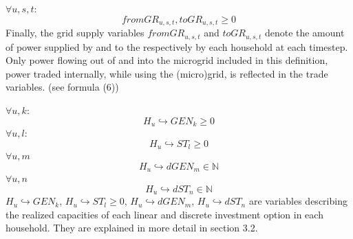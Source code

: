 \documentclass[
	11pt,								%
	DIV10,								%
	a4paper,         					%
	oneside,							%
	headheight=20pt,					%
	footheight=20pt,					%
    parskip=full,						%
    listof=totoc,						%
	bibliography=totoc,					%
	index=totoc,						%
]{scrartcl}
\begin{document}
	\\\\
	$\forall u,s,t$:
	\begin{equation}
		fromGR_{u,s,t}, toGR_{u,s,t} \geq 0
	\end{equation}
	Finally, the grid supply variables $fromGR_{u,s,t}$ and $toGR_{u,s,t}$ denote the amount of power supplied by and to the respectively by each household at each timestep. Only power flowing out of and into the microgrid included in this definition, power traded internally, while using the (micro)grid, is reflected in the trade variables. (see formula (6))
	
	$\forall u,k$:
	\begin{equation}
		H_u\hookrightarrow GEN_k \geq 0
	\end{equation}
	$\forall u,l$:
	\begin{equation}
		H_u\hookrightarrow  ST_l \geq 0
	\end{equation}
	$\forall u,m$
	\begin{equation}
		H_u\hookrightarrow d GEN_m \in \mathbb{N}
	\end{equation}
	$\forall u,n$
	\begin{equation}
		H_u\hookrightarrow d ST_n \in \mathbb{N}
	\end{equation}
	$H_u\hookrightarrow GEN_k$, $H_u\hookrightarrow  ST_l \geq 0$, $H_u\hookrightarrow d GEN_m$, $H_u\hookrightarrow d ST_n$ are variables describing the realized capacities of each linear and discrete investment option in each household. They are explained in more detail in section 3.2.
\end{document}
